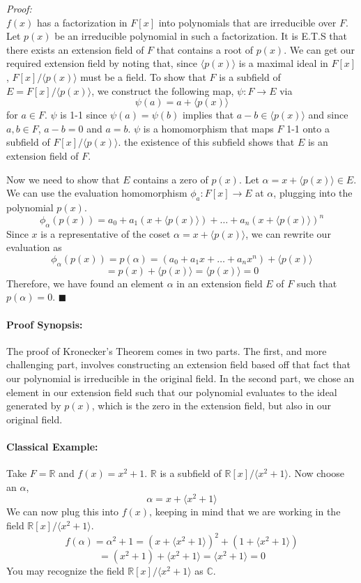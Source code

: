 \documentclass[10pt,a4paper]{article}
\begin{document}
\begin{flushleft}
\textit{Proof:} \\
$f(x)$ has a factorization in $F[x]$ into polynomials that are irreducible over $F$. 
Let $p(x)$ be an irreducible polynomial in such a factorization.
It is E.T.S that there exists an extension field of $F$ that contains a root of $p(x)$.
We can get our required extension field by noting that, since $\langle p(x) \rangle$ is a maximal ideal in $F[x]$, $F[x]/\langle p(x) \rangle$ must be a field. To show that $F$ is a subfield of $E = F[x]/ \langle  p(x) \rangle$, we construct the following map, $\psi: F \to E$ via $$ \psi(a) = a + \langle p(x) \rangle$$ for $a \in F$. $\psi$ is 1-1 since $\psi(a) = \psi(b)$ implies that $a-b \in \langle p(x) \rangle$ and since $a,b \in F$, $a-b=0$ and $a=b$.  $\psi$ is a homomorphism that maps $F$ 1-1 onto a subfield of $F[x]/\langle p(x) \rangle$. the existence of this subfield shows that $E$ is an extension field of $F$. 

Now we need to show that $E$ contains a zero of $p(x)$. Let $\alpha = x + \langle p(x) \rangle \in E$. We can use the evaluation homomorphism $\phi_a:F[x] \to E$ at $\alpha$, plugging into the polynomial $p(x)$. 
$$ \phi_\alpha(p(x)) = a_0 + a_1(x+\langle p(x) \rangle)+ \dots + a_n(x+\langle p(x) \rangle)^n$$ Since $x$ is a representative of the coset $\alpha = x + \langle p(x) \rangle$, we can rewrite our evaluation as 
$$\phi_\alpha(p(x)) = p(\alpha) = (a_0+a_1x+\dots+a_nx^n) + \langle p(x) \rangle$$
$$ = p(x) + \langle p(x) \rangle = \langle p(x) \rangle = 0$$
Therefore, we have found an element $\alpha$ in an extension field $E$ of $F$ such that $p(\alpha) = 0$. $\blacksquare$

\paragraph{Proof Synopsis:} The proof of Kronecker's Theorem comes in two parts. The first, and more challenging part, involves constructing an extension field based off that fact that our polynomial is irreducible in the original field. In the second part, we chose an element in our extension field such that our polynomial evaluates to the ideal generated by $p(x)$, which is the zero in the extension field, but also in our original field.
\end{flushleft}

\paragraph{Classical Example:} Take $F = \mathbb{R}$ and $f(x) = x^2+1$. $\mathbb{R}$ is a subfield of $\mathbb{R}[x]/\langle x^2+1 \rangle$. Now choose an $\alpha$, 
$$ \alpha = x + \langle x^2 +1 \rangle$$
We can now plug this into $f(x)$, keeping in mind that we are working in the field $\mathbb{R}[x]/\langle x^2 + 1 \rangle$.
$$ f(\alpha) = \alpha^2 + 1 = (x + \langle x^2 +1 \rangle)^2 +(1 + \langle x^2 +1 \rangle)$$
$$ = (x^2+1) + \langle x^2 + 1 \rangle = \langle x^2 + 1 \rangle = 0$$
You may recognize the field $\mathbb{R}[x]/\langle x^2+1 \rangle$ as $\mathbb{C}$.
\end{document}
